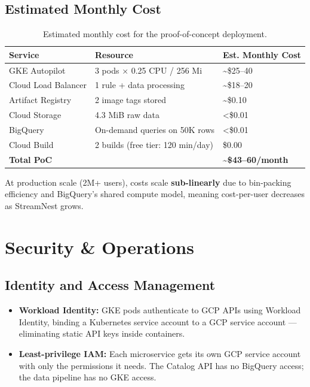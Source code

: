 \documentclass[12pt, a4paper]{article}
\begin{document}
\subsection{Estimated Monthly Cost}

\begin{table}[htbp]
\centering
\renewcommand{\arraystretch}{1.4}
\begin{tabular}{lll}
\toprule
\textbf{Service} & \textbf{Resource} & \textbf{Est. Monthly Cost} \\
\midrule
GKE Autopilot       & 3 pods × 0.25 CPU / 256 Mi       & \textasciitilde\$25–40 \\
Cloud Load Balancer & 1 rule + data processing          & \textasciitilde\$18–20 \\
Artifact Registry   & 2 image tags stored               & \textasciitilde\$0.10  \\
Cloud Storage       & 4.3 MiB raw data                  & \textless\$0.01        \\
BigQuery            & On-demand queries on 50K rows     & \textless\$0.01        \\
Cloud Build         & 2 builds (free tier: 120 min/day) & \$0.00                 \\
\midrule
\textbf{Total PoC}  &                                   & \textbf{\textasciitilde\$43–60/month} \\
\bottomrule
\end{tabular}
\caption{Estimated monthly cost for the proof-of-concept deployment.}
\end{table}

At production scale (2M+ users), costs scale \textbf{sub-linearly} due to bin-packing efficiency and BigQuery's shared compute model, meaning cost-per-user decreases as StreamNest grows.

\section{Security \& Operations}

\subsection{Identity and Access Management}

\begin{itemize}
    \item \textbf{Workload Identity:} GKE pods authenticate to GCP APIs using Workload Identity, binding a Kubernetes service account to a GCP service account — eliminating static API keys inside containers.
    \item \textbf{Least-privilege IAM:} Each microservice gets its own GCP service account with only the permissions it needs. The Catalog API has no BigQuery access; the data pipeline has no GKE access.
\end{itemize}
\end{document}
